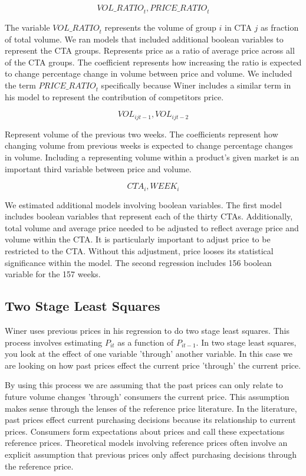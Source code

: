 \documentclass{article}
\begin{document}
$${VOL\_RATIO}_t, {PRICE\_RATIO}_{t} $$ 

The variable $ {VOL\_RATIO}_t $ represents the volume of group $i$ in CTA $j$ as  fraction of total volume. We ran models that included additional boolean variables to represent the CTA groups. 
Represents price as a ratio of average price across all of the CTA groups. The coefficient represents how increasing the ratio is expected to change percentage change in volume between price and volume. We included the term ${PRICE\_RATIO}_{t}$  specifically because Winer includes a similar term in his model to represent the contribution of competitors price.

$${VOL}_{ijt-1}, {VOL}_{ijt-2} $$

Represent volume of the previous two weeks. The coefficients represent how changing volume from previous weeks is expected to change percentage changes in volume. Including a representing volume within a product's given market is an important third variable between price and volume.

$$ CTA_i, WEEK_{i}$$

We estimated additional models involving boolean variables. The first model includes boolean variables that represent each of the thirty CTAs. Additionally, total volume and average price needed to be adjusted to reflect average price and volume within the CTA. It is particularly important to adjust price to be restricted to the CTA. Without this adjustment, price looses its statistical significance within the model. The second regression includes 156 boolean variable for the 157 weeks.

\subsection{Two Stage Least Squares}

Winer uses previous prices in his regression to do two stage least squares. This process involves estimating ${P}_{it}$ as a function of ${P}_{it-1}$. In two stage least squares, you look at the effect of one variable 'through' another variable.  In this case we are looking on how past prices effect the current price 'through' the current price. 

By using this process we are assuming that the past prices can only relate to future volume changes 'through' consumers the current price. This assumption makes sense through the lenses of the reference price literature. In the literature, past prices effect current purchasing decisions because its relationship to current prices. Consumers form expectations about prices and call these expectations reference prices. Theoretical models involving reference prices often involve an explicit assumption that previous prices only affect purchasing decisions through the reference price.
\end{document}
